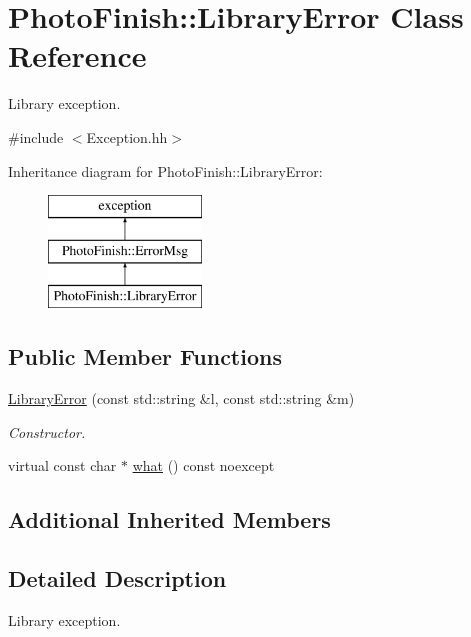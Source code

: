 \hypertarget{class_photo_finish_1_1_library_error}{}\section{Photo\+Finish\+:\+:Library\+Error Class Reference}
\label{class_photo_finish_1_1_library_error}


Library exception.  




{\ttfamily \#include $<$Exception.\+hh$>$}

Inheritance diagram for Photo\+Finish\+:\+:Library\+Error\+:\begin{figure}[H]
\begin{center}
\leavevmode
\includegraphics[height=3.000000cm]{class_photo_finish_1_1_library_error}
\end{center}
\end{figure}
\subsection*{Public Member Functions}
\begin{DoxyCompactItemize}
\item 
\hyperlink{class_photo_finish_1_1_library_error_a09132fe2fd229890f2e1d509161032bf}{Library\+Error} (const std\+::string \&l, const std\+::string \&m)
\begin{DoxyCompactList}\small\item\em Constructor. \end{DoxyCompactList}\item 
virtual const char $\ast$ \hyperlink{class_photo_finish_1_1_library_error_a197031356327dc3b10f49536987abb73}{what} () const noexcept
\end{DoxyCompactItemize}
\subsection*{Additional Inherited Members}


\subsection{Detailed Description}
Library exception. 

